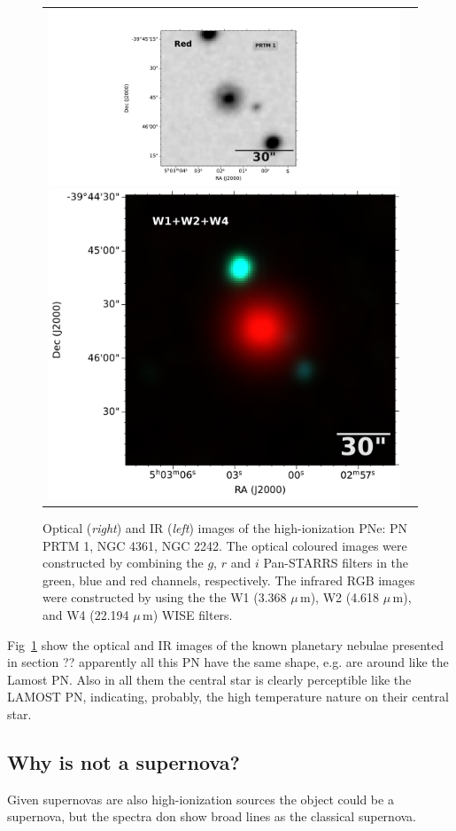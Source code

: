 \documentclass[fleqn,usenatbib]{mnras}
\begin{document}
{\begin{figure}
\begin{tabular}{l l}
\includegraphics[width=0.535\linewidth, trim=280 10 330 10, clip]{Figs/dss_search_red.pdf}
\includegraphics[width=0.47\linewidth, trim=58 0 0 0]{Figs/0754m394_ac51-w4-int-3_ra75.75721626934_dec-39.76236833917_asec150.000-421-RGB.pdf}\\

\end{tabular}  
  \caption{Optical (\textit{right}) and IR (\textit{left}) images of the 
    high-ionization PNe: PN PRTM 1, NGC 4361, NGC 2242.
    The optical coloured images were constructed by combining the
    $g$, $r$ and $i$ Pan-STARRS filters in the green, blue and red channels, respectively.
  The infrared RGB images were constructed by using the the W1 (3.368 $\mu$\,m), W2 (4.618 $\mu$\,m), and W4 (22.194 $\mu$\,m) WISE filters.} 
  \label{fig:images-known}
\end{figure}

Fig~\ref{fig:images-known} show the optical and IR images of the known planetary nebulae
presented in section ?? apparently all this PN have the same shape, e.g. are around like
the Lamost PN. Also in all them the central star is clearly perceptible like the LAMOST PN,
indicating, probably, the high temperature nature on their central star.

\subsection{Why is not a supernova?}
\label{sec:snr}

Given supernovas are also high-ionization sources the object could be
a supernova, but the spectra don show broad lines as the classical supernova.

}
\end{document}
